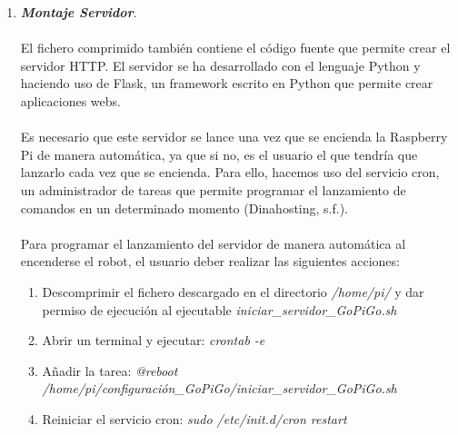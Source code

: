 \documentclass{report}
\begin{document}
\begin{enumerate}
\begin{lstlisting}[frame=single,breaklines=true, label=Ejecutable para instalación y configuración de la Raspberry Pi, caption=Ejecutable para instalación y configuración de la Raspberry Pi,  captionpos=b]
echo "Creando entorno virtual python3"

python3 -m venv ~/.virtualenvs/GoPiGo
source ~/.virtualenvs/GoPiGo/bin/activate
pip install GoPiGo3
pip install numpy
pip install pandas
pip install Flask
deactivate

echo "Finalizado Creacion de entonro virtual"

### Configurar ip estatica ###

echo "Configurando ip estatica"

sudo service dhcpcd status
sudo service dhcpcd start
sudo systemctl enable dhcpcd

echo -e "\ninterface wlan0\nstatic ip_address=192.168.1.200/24\nstatic routers=192.168.1.1\nstatic domain_name_servers=192.168.1.1" >> /etc/dhcpcd.conf

echo "Configurada ip estatica"

echo "##########################"
echo "### Proceso Completado ###"
echo "##########################"

read -p "Necesitas reiniciar. Quieres tu reiniciarl la maquina? [y/n]: " restart
if [ "$restart" = "y" ]; then
        sudo reboot
fi
	\end{lstlisting}
	\item \textit{\textbf{Montaje Servidor}}. 
	\\
	\\
	El fichero comprimido también contiene el código fuente que permite crear el servidor HTTP. El servidor se ha desarrollado con el lenguaje Python y haciendo uso de Flask, un framework escrito en Python que permite crear aplicaciones webs.
	\\
	\\
	Es necesario que este servidor se lance una vez que se encienda la Raspberry Pi de manera automática, ya que si no, es el usuario el que tendría que lanzarlo cada vez que se encienda. Para ello, hacemos uso del servicio cron, un administrador de tareas que permite programar el lanzamiento de comandos en un determinado momento (Dinahosting, s.f.).
	\\
	\\
	Para programar el lanzamiento del servidor de manera automática al encenderse el robot, el usuario deber realizar las siguientes acciones:
	\begin{enumerate}
		\item Descomprimir el fichero descargado en el directorio \textit{/home/pi/} y dar permiso de ejecución al ejecutable \textit{iniciar\_servidor\_GoPiGo.sh}
		\item Abrir un terminal y ejecutar:  \textit{crontab -e}
		\item Añadir la tarea: \textit{@reboot /home/pi/configuración\_GoPiGo/iniciar\_servidor\_GoPiGo.sh}
		\item Reiniciar el servicio cron: \textit{sudo /etc/init.d/cron restart}
	\end{enumerate}
\end{enumerate}
\end{document}
